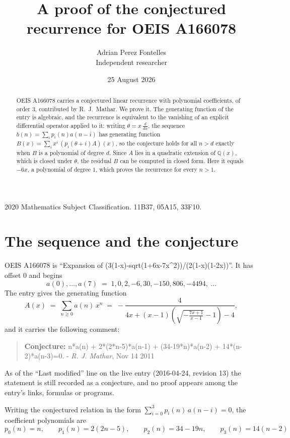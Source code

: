 \documentclass[11pt,a4paper]{article}
\title{A proof of the conjectured recurrence for OEIS A166078}
\author{Adrian Perez Fontelles\\ \small Independent researcher}
\date{25 August 2026}
\theoremstyle{plain}
\theoremstyle{definition}
\begin{document}
\maketitle

\begin{abstract}
OEIS A166078 carries a conjectured linear recurrence with polynomial coefficients, of
order 3, contributed by R.~J.~Mathar. We prove it. The generating function of the
entry is algebraic, and the recurrence is equivalent to the vanishing of an explicit
differential operator applied to it: writing $\theta=x\,\frac{d}{dx}$, the sequence
$b(n)=\sum_{i}p_{i}(n)a(n-i)$ has generating function
$B(x)=\sum_{i}x^{i}\,(p_{i}(\theta+i)A)(x)$, so the conjecture holds for all $n>d$ exactly
when $B$ is a polynomial of degree $d$. Since $A$ lies in a quadratic extension of
$\mathbb{Q}(x)$, which is closed under $\theta$, the residual $B$ can be computed in
closed form. Here it equals $- 6 x$, a polynomial of degree $1$, which proves
the recurrence for every $n>1$.
\end{abstract}

\noindent\small 2020 Mathematics Subject Classification. 11B37, 05A15, 33F10.\normalsize

\section{The sequence and the conjecture}

OEIS A166078 is ``Expansion of (3(1-x)-sqrt(1+6x-7x\^{}2))/(2(1-x)(1-2x))''. It has offset $0$ and begins
\[
a(0),\dots,a(7)\;=\;1, 0, 2, -6, 30, -150, 806, -4494,\ \dots
\]
The entry gives the generating function
\begin{equation}\label{eq:gf}
A(x)\;=\;\sum_{n\ge 0} a(n)\,x^{n}\;=\;- \frac{4}{4 x + \left(x - 1\right) \left(\sqrt{- \frac{7 x + 1}{x - 1}} - 1\right) - 4} ,
\end{equation}
and it carries the following comment:
\begin{quote}\small
\textbf{Conjecture:} n*a(n) + 2*(2*n-5)*a(n-1) + (34-19*n)*a(n-2) + 14*(n-2)*a(n-3)=0. - \emph{R. J. Mathar}, Nov 14 2011
\end{quote}
As of the ``Last modified'' line on the live entry (2016-04-24, revision 13) the
statement is still recorded as a conjecture, and no proof appears among the entry's links,
formulas or programs.

Writing the conjectured relation in the form $\sum_{i=0}^{3}p_{i}(n)\,a(n-i)=0$,
the coefficient polynomials are
\[
p_{0}(n)=n,\qquad p_{1}(n)=2 \left(2 n - 5\right),\qquad p_{2}(n)=34 - 19 n,\qquad p_{3}(n)=14 \left(n - 2\right)
\]
\end{document}
